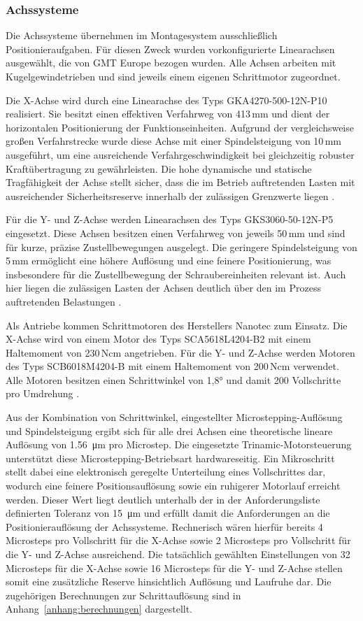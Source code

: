 \subsubsection{Achssysteme}
Die Achssysteme übernehmen im Montagesystem ausschließlich Positionieraufgaben. Für diesen Zweck wurden vorkonfigurierte Linearachsen ausgewählt, die von GMT Europe bezogen wurden. Alle Achsen arbeiten mit Kugelgewindetrieben und sind jeweils einem eigenen Schrittmotor zugeordnet.

Die X-Achse wird durch eine Linearachse des Typs GKA4270-500-12N-P10 realisiert. Sie besitzt einen effektiven Verfahrweg von 413\,mm und dient der horizontalen Positionierung der Funktionseinheiten. Aufgrund der vergleichsweise großen Verfahrstrecke wurde diese Achse mit einer Spindelsteigung von 10\,mm ausgeführt, um eine ausreichende Verfahrgeschwindigkeit bei gleichzeitig robuster Kraftübertragung zu gewährleisten. Die hohe dynamische und statische Tragfähigkeit der Achse stellt sicher, dass die im Betrieb auftretenden Lasten mit ausreichender Sicherheitsreserve innerhalb der zulässigen Grenzwerte liegen \cite{ds_gmt_gka_gks}.

Für die Y- und Z-Achse werden Linearachsen des Typs GKS3060-50-12N-P5 eingesetzt. Diese Achsen besitzen einen Verfahrweg von jeweils 50\,mm und sind für kurze, präzise Zustellbewegungen ausgelegt. Die geringere Spindelsteigung von 5\,mm ermöglicht eine höhere Auflösung und eine feinere Positionierung, was insbesondere für die Zustellbewegung der Schraubereinheiten relevant ist. Auch hier liegen die zulässigen Lasten der Achsen deutlich über den im Prozess auftretenden Belastungen \cite{ds_gmt_gka_gks}.

Als Antriebe kommen Schrittmotoren des Herstellers Nanotec zum Einsatz. Die X-Achse wird von einem Motor des Typs SCA5618L4204-B2 mit einem Haltemoment von 230\,Ncm angetrieben. Für die Y- und Z-Achse werden Motoren des Typs SCB6018M4204-B mit einem Haltemoment von 200\,Ncm verwendet. Alle Motoren besitzen einen Schrittwinkel von 1{,}8° und damit 200 Vollschritte pro Umdrehung \cite{ds_nanotec_sca5618,ds_nanotec_scb6018}.

Aus der Kombination von Schrittwinkel, eingestellter Microstepping-Auflösung und Spindelsteigung ergibt sich für alle drei Achsen eine theoretische lineare Auflösung von \qty{1,56}{\micro\meter} pro Microstep. Die eingesetzte Trinamic-Motorsteuerung unterstützt diese Microstepping-Betriebsart hardwareseitig. Ein Mikroschritt stellt dabei eine elektronisch geregelte Unterteilung eines Vollschrittes dar, wodurch eine feinere Positionsauflösung sowie ein ruhigerer Motorlauf erreicht werden. Dieser Wert liegt deutlich unterhalb der in der Anforderungsliste definierten Toleranz von \qty{15}{\micro\metre} und erfüllt damit die Anforderungen an die Positionierauflösung der Achssysteme. Rechnerisch wären hierfür bereits 4 Microsteps pro Vollschritt für die X-Achse sowie 2 Microsteps pro Vollschritt für die Y- und Z-Achse ausreichend. Die tatsächlich gewählten Einstellungen von 32 Microsteps für die X-Achse sowie 16 Microsteps für die Y- und Z-Achse stellen somit eine zusätzliche Reserve hinsichtlich Auflösung und Laufruhe dar. Die zugehörigen Berechnungen zur Schrittauflösung sind in Anhang~\ref{anhang:berechnungen} dargestellt.

